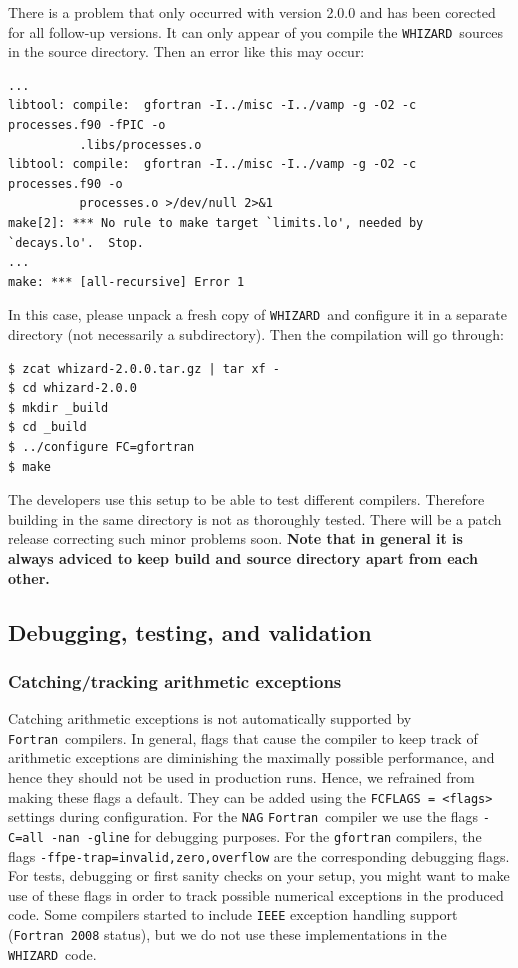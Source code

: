 \documentclass[12pt]{book}
\newcommand{\ttt}[1]{\texttt{#1}}
\newcommand{\whizard}{\texttt{WHIZARD}}
\newcommand{\fortran}{\texttt{Fortran}}
\begin{document}
There is a problem that only occurred with version 2.0.0 and has been
corected for all follow-up versions. It can only appear of you
compile the \whizard\ sources in the source directory. Then an error
like this may occur:
\begin{footnotesize}
\begin{Verbatim}[frame=single]
...
libtool: compile:  gfortran -I../misc -I../vamp -g -O2 -c processes.f90 -fPIC -o 
          .libs/processes.o
libtool: compile:  gfortran -I../misc -I../vamp -g -O2 -c processes.f90 -o
          processes.o >/dev/null 2>&1
make[2]: *** No rule to make target `limits.lo', needed by `decays.lo'.  Stop.
...
make: *** [all-recursive] Error 1
\end{Verbatim}
\end{footnotesize}
In this case, please unpack a fresh copy of \whizard\ and configure it
in a separate directory (not necessarily a subdirectory). Then the
compilation will go through:
\begin{footnotesize}
\begin{Verbatim}[frame=single]
$ zcat whizard-2.0.0.tar.gz | tar xf - 
$ cd whizard-2.0.0
$ mkdir _build
$ cd _build
$ ../configure FC=gfortran
$ make  
\end{Verbatim}
\end{footnotesize}
The developers use this setup to be able to test different
compilers. Therefore building in the same directory is not as
thoroughly tested. There will be a patch release correcting such minor
problems soon. {\bf Note that in general it is always adviced to keep
  build and source directory apart from each other.}


\subsection{Debugging, testing, and validation}


\subsubsection{Catching/tracking arithmetic exceptions}

Catching arithmetic exceptions is not automatically supported by
\fortran\ compilers. In general, flags that cause the compiler to keep
track of arithmetic exceptions are diminishing the maximally possible
performance, and hence they should not be used in production
runs. Hence, we refrained from making these flags a default.
They can be added using the \ttt{FCFLAGS = <flags>} settings during
configuration. For the \ttt{NAG} \fortran\ compiler we use the flags
\ttt{-C=all -nan -gline} for debugging purposes. For the \ttt{gfortran}
compilers, the flags \ttt{-ffpe-trap=invalid,zero,overflow} are the
corresponding debugging flags. For tests, debugging or first sanity
checks on your setup, you might want to make use of these flags in
order to track possible numerical exceptions in the produced code. 
Some compilers started to include \ttt{IEEE} exception handling
support (\ttt{Fortran 2008} status), but we do not use these
implementations in the \whizard\ code.  
\end{document}
